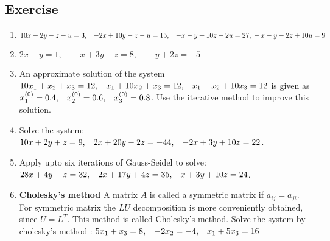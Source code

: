 \documentclass[aima203_lecturenotes_ku.tex]{subfiles}
\begin{document}
 \subsection{Exercise}
 \begin{enumerate}
 \item $10x-2y-z-u=3, \;\;\; -2x+10y-z-u = 15, \;\;\; -x-y+10z-2u=27, \\ -x-y-2z+10u = 9$
 \item $2x-y=1, \;\;\; -x+3y-z = 8, \;\;\; -y+2z=-5$

 \item An approximate solution of the system $10x_1 + x_2 +x_3 = 12, \hspace{3mm} x_1 + 10x_2 +x_3 = 12, \hspace{3mm} x_1 + x_2 + 10x_3 =12$ is given as $x_1^{(0)}=0.4, \hspace{3mm} x_2^{(0)}=0.6, \hspace{3mm} x_3^{(0)}=0.8$. Use the iterative method to improve this solution.

 \item Solve the system: $10x + 2y +z = 9, \hspace{3mm} 2x + 20y -2z = -44, \hspace{3mm} -2x+3y +10z = 22$.

 \item Apply upto six iterations of Gauss-Seidel to solve: $28x+4y-z=32, \hspace{3mm} 2x+17y+4z=35, \hspace{3mm} x+3y+10z=24$.

 \item \textbf{Cholesky's method} A matrix $A$ is called a symmetric matrix if $a_{ij} =a_{ji}$. For symmetric matrix the $LU$ decomposition is more conveniently obtained, since $U=L^{T}$. This method is called Cholesky's method. Solve the system by cholesky's method : $5x_1 + x_3 = 8 , \hspace{3mm} -2x_2 =-4, \hspace{3mm} x_1 + 5x_3 = 16$
 \end{enumerate}
\end{document}
